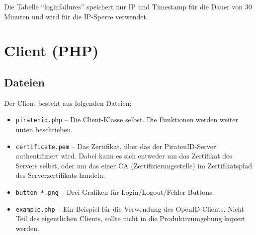 Die Tabelle "`loginfailures"' speichert nur IP und Timestamp für die Dauer von 30 Minuten und wird für die IP-Sperre verwendet.

\newpage
\section{Client (PHP)}


\subsection{Dateien}
Der Client besteht aus folgenden Dateien:
\begin{itemize}
	\item \texttt{piratenid.php} --
		Die Client-Klasse selbst. Die Funktionen werden weiter unten beschrieben.
	\item \texttt{certificate.pem} -- 
		Das Zertifikat, über das der PiratenID-Server authentifiziert wird.
		Dabei kann es sich entweder um das Zertifikat des Servers selbst,
		oder um das einer CA (Zertifizierungsstelle) im Zertifikatspfad des Serverzertifikats handeln.
	\item \texttt{button-*.png} --
		Drei Grafiken für Login/Logout/Fehler-Buttons.
	\item \texttt{example.php} --
		Ein Beispiel für die Verwendung des OpenID-Clients. Nicht Teil des eigentlichen Clients, sollte nicht in die Produktivumgebung kopiert werden.
\end{itemize}

